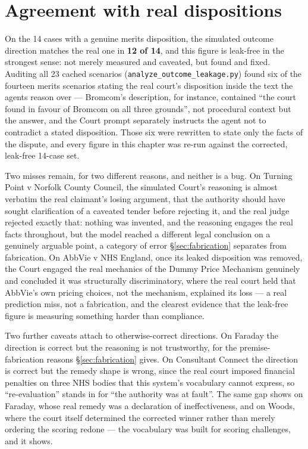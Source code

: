 \section{Agreement with real dispositions}
\label{sec:agreement}

On the 14 cases with a genuine merits disposition, the simulated outcome
direction matches the real one in \textbf{12 of 14}, and this figure is
leak-free in the strongest sense: not merely measured and caveated, but
found and fixed. Auditing all 23 cached scenarios
(\texttt{analyze\_outcome\_leakage.py}) found six of the fourteen merits
scenarios stating the real court's disposition inside the text the agents
reason over --- Bromcom's description, for instance, contained ``the court
found in favour of Bromcom on all three grounds'', not procedural context
but the answer, and the Court prompt separately instructs the agent not to
contradict a stated disposition.\label{sec:leakage} Those six were
rewritten to state only the facts of the dispute, and every figure in this
chapter was re-run against the corrected, leak-free 14-case set.

Two misses remain, for two different reasons, and neither is a bug. On
Turning Point v Norfolk County Council, the simulated Court's reasoning is
almost verbatim the real claimant's losing argument, that the authority
should have sought clarification of a caveated tender before rejecting it,
and the real judge rejected exactly that: nothing was invented, and the
reasoning engages the real facts throughout, but the model reached a
different legal conclusion on a genuinely arguable point, a category of
error \S\ref{sec:fabrication} separates from fabrication. On AbbVie v NHS
England, once its leaked disposition was removed, the Court engaged the
real mechanics of the Dummy Price Mechanism genuinely and concluded it was
structurally discriminatory, where the real court held that AbbVie's own
pricing choices, not the mechanism, explained its loss --- a real
prediction miss, not a fabrication, and the clearest evidence that the
leak-free figure is measuring something harder than compliance.

Two further caveats attach to otherwise-correct directions. On Faraday the
direction is correct but the reasoning is not trustworthy, for the
premise-fabrication reasons \S\ref{sec:fabrication} gives. On Consultant
Connect the direction is correct but the remedy shape is wrong, since the
real court imposed financial penalties on three NHS bodies that this
system's vocabulary cannot express, so ``re-evaluation'' stands in for ``the
authority was at fault''. The same gap shows on Faraday, whose real remedy
was a declaration of ineffectiveness, and on Woods, where the court itself
determined the corrected winner rather than merely ordering the scoring
redone --- the vocabulary was built for scoring challenges, and it shows.

